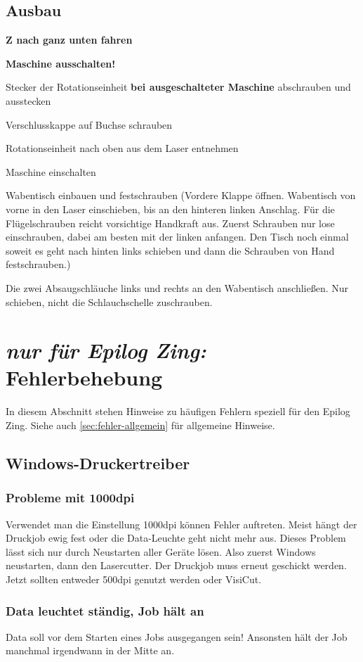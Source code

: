 \documentclass{\basedir/fablab-document}
\newcommand{\nurZing}{\emph{nur für Epilog Zing:} }
\begin{document}
	\subsection{Ausbau}
	\textbf{Z nach ganz unten fahren}

	\textbf{Maschine ausschalten!}

	Stecker der Rotationseinheit \textbf{bei ausgeschalteter Maschine} abschrauben und ausstecken

	Verschlusskappe auf Buchse schrauben

	Rotationseinheit nach oben aus dem Laser entnehmen

	Maschine einschalten

	Wabentisch einbauen und festschrauben (Vordere Klappe öffnen. Wabentisch von vorne in den Laser einschieben, bis an den hinteren linken Anschlag. Für die Flügelschrauben reicht vorsichtige Handkraft aus. Zuerst Schrauben nur lose einschrauben, dabei am besten mit der linken anfangen. Den Tisch noch einmal soweit es geht nach hinten links schieben und dann die Schrauben von Hand festschrauben.)

	 Die zwei Absaugschläuche links und rechts an den Wabentisch anschließen. Nur schieben, nicht die Schlauchschelle zuschrauben.

	\section{\nurZing Fehlerbehebung}
	In diesem Abschnitt stehen Hinweise zu häufigen Fehlern speziell für den Epilog Zing. Siehe auch \cref{sec:fehler-allgemein} für allgemeine Hinweise.

	\subsection{Windows-Druckertreiber}
	\subsubsection{Probleme mit 1000dpi}
	Verwendet man die Einstellung 1000dpi können Fehler auftreten. Meist hängt der Druckjob ewig fest oder die Data-Leuchte geht nicht mehr aus. Dieses Problem lässt sich nur durch Neustarten aller Geräte lösen. Also zuerst Windows neustarten, dann den Lasercutter. Der Druckjob muss erneut geschickt werden. Jetzt sollten entweder 500dpi genutzt werden oder VisiCut.

	\subsubsection{Data leuchtet ständig, Job hält an}
	Data soll vor dem Starten eines Jobs ausgegangen sein! Ansonsten hält der Job manchmal irgendwann in der Mitte an.
\end{document}
